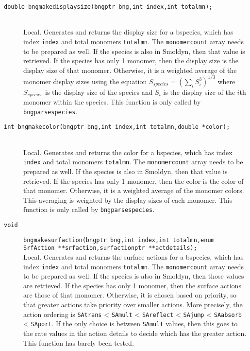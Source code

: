 \documentclass {book}
\begin{document}
\begin{description}
\item[\texttt{double bngmakedisplaysize(bngptr bng,int index,int totalmn);}]
\hfill \\
Local.  Generates and returns the display size for a bspecies, which has index \texttt{index} and total monomers \texttt{totalmn}.  The \texttt{monomercount} array needs to be prepared as well.  If the species is also in Smoldyn, then that value is retrieved.  If the species has only 1 monomer, then the display size is the display size of that monomer.  Otherwise, it is a weighted average of the monomer display sizes using the equation
$S_{species} = (\sum_{i} S_i^{3})^{1/3}$
where $S_{species}$ is the display size of the species and $S_i$ is the display size of the $i$th monomer within the species.  This function is only called by \texttt{bngparsespecies}.

\item[\texttt{int bngmakecolor(bngptr bng,int index,int totalmn,double *color);}]
\hfill \\
Local.  Generates and returns the color for a bspecies, which has index \texttt{index} and total monomers \texttt{totalmn}.  The \texttt{monomercount} array needs to be prepared as well.  If the species is also in Smoldyn, then that value is retrieved.  If the species has only 1 monomer, then the color is the color of that monomer.  Otherwise, it is a weighted average of the monomer colors.  This averaging is weighted by the display sizes of each monomer.  This function is only called by \texttt{bngparsespecies}.

\item[\texttt{void}]
\texttt{bngmakesurfaction(bngptr bng,int index,int totalmn,enum SrfAction **srfaction,surfactionptr **actdetails);}
\hfill \\
Local.  Generates and returns the surface actions for a bspecies, which has index \texttt{index} and total monomers \texttt{totalmn}.  The \texttt{monomercount} array needs to be prepared as well.  If the species is also in Smoldyn, then those values are retrieved.  If the species has only 1 monomer, then the surface actions are those of that monomer.  Otherwise, it is chosen based on priority, so that greater actions take priority over smaller actions.  More precisely, the action ordering is \texttt{SAtrans} < \texttt{SAmult} < \texttt{SAreflect} < \texttt{SAjump} < \texttt{SAabsorb} < \texttt{SAport}.  If the only choice is between \texttt{SAmult} values, then this goes to the rate values in the action details to decide which has the greater action.  This function has barely been tested.


\end{description}
\end{document}
